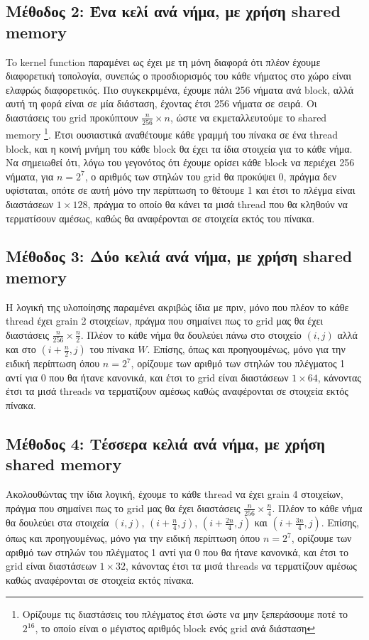\documentclass[11pt,a4paper,titlepage]{article}
\begin{document}
\subsection{Μέθοδος 2: Ένα κελί ανά νήμα, με χρήση shared memory}
	To kernel function παραμένει ως έχει με τη μόνη διαφορά ότι πλέον έχουμε διαφορετική τοπολογία, συνεπώς ο προσδιορισμός του κάθε νήματος στο χώρο είναι ελαφρώς διαφορετικός. Πιο συγκεκριμένα, έχουμε πάλι 256 νήματα ανά block, αλλά αυτή τη φορά είναι σε μία διάσταση, έχοντας έτσι 256 νήματα σε σειρά. Οι διαστάσεις του grid προκύπτουν $\tfrac{n}{256}\times n$,   ώστε να εκμεταλλευτούμε το shared memory \footnote{Ορίζουμε τις διαστάσεις του πλέγματος έτσι ώστε να μην ξεπεράσουμε ποτέ το $2^{16}$, το οποίο είναι ο μέγιστος αριθμός block ενός grid ανά διάσταση}. Έτσι ουσιαστικά αναθέτουμε κάθε γραμμή του πίνακα σε ένα thread block, και η κοινή μνήμη του κάθε block θα έχει τα ίδια στοιχεία για το κάθε νήμα. Να σημειωθεί ότι, λόγω του γεγονότος ότι έχουμε ορίσει κάθε block να περιέχει 256 νήματα, για $n = 2^7$, ο αριθμός των στηλών του grid θα προκύψει 0, πράγμα δεν υφίσταται, οπότε σε αυτή μόνο την περίπτωση το θέτουμε 1 και έτσι το πλέγμα είναι διαστάσεων $1\times 128$, πράγμα το οποίο θα κάνει τα μισά thread που θα κληθούν να τερματίσουν αμέσως, καθώς θα αναφέρονται σε στοιχεία εκτός του πίνακα.
\subsection{Μέθοδος 3: Δύο κελιά ανά νήμα, με χρήση shared memory}
	Η λογική της υλοποίησης παραμένει ακριβώς ίδια με πριν, μόνο που πλέον το κάθε thread έχει grain 2 στοιχείων, πράγμα που σημαίνει πως το grid μας θα έχει διαστάσεις $\tfrac{n}{256}\times\tfrac{n}{2}$. Πλέον το κάθε νήμα θα δουλεύει πάνω στο στοιχείο $(i, j)$ αλλά και στο $(i + \tfrac{n}{2}, j)$ του πίνακα $W$. Επίσης, όπως και προηγουμένως, μόνο για την ειδική περίπτωση όπου $n = 2^7$, ορίζουμε των αριθμό των στηλών του πλέγματος 1 αντί για 0 που θα ήτανε κανονικά, και έτσι το grid είναι διαστάσεων $1\times 64$, κάνοντας έτσι τα μισά threads να τερματίζουν αμέσως καθώς αναφέρονται σε στοιχεία εκτός πίνακα.
\subsection{Μέθοδος 4: Τέσσερα κελιά ανά νήμα, με χρήση shared memory}
	Ακολουθώντας την ίδια λογική, έχουμε το κάθε thread να έχει grain 4 στοιχείων, πράγμα που σημαίνει πως το grid μας θα έχει διαστάσεις $\tfrac{n}{256}\times\tfrac{n}{4}$. Πλέον το κάθε νήμα θα δουλεύει στα στοιχεία $\left(i, j\right)$, $\left(i + \tfrac{n}{4}, j\right)$, $\left(i + \tfrac{2n}{4}, j\right)$ και $\left(i + \tfrac{3n}{4}, j\right)$. Επίσης, όπως και προηγουμένως, μόνο για την ειδική περίπτωση όπου $n = 2^7$, ορίζουμε των αριθμό των στηλών του πλέγματος 1 αντί για 0 που θα ήτανε κανονικά, και έτσι το grid είναι διαστάσεων $1\times 32$, κάνοντας έτσι τα μισά threads να τερματίζουν αμέσως καθώς αναφέρονται σε στοιχεία εκτός πίνακα.
\end{document}
